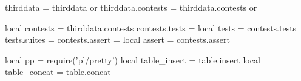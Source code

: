 thirddata          = thirddata          or {}
thirddata.contests = thirddata.contests or {}

local contests  = thirddata.contests
contests.tests  = {}
local tests     = contests.tests
tests.suites    = {}
contests.assert = {}
local assert    = contests.assert

local pp = require('pl/pretty')
local table_insert = table.insert
local table_concat = table.concat

\stopLuaCode

\stopchapter